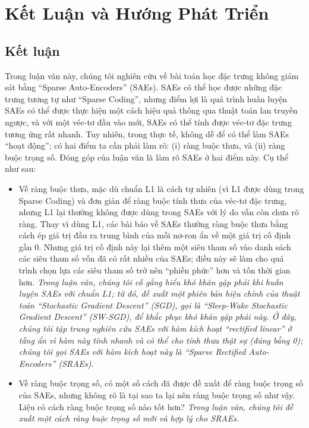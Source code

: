 \def\baselinestretch{1}
\chapter{Kết Luận và Hướng Phát Triển}
\ifpdf
    \graphicspath{{Conclusions/ConclusionsFigs/PNG/}{Conclusions/ConclusionsFigs/PDF/}{Conclusions/ConclusionsFigs/}}
\else
    \graphicspath{{Conclusions/ConclusionsFigs/EPS/}{Conclusions/ConclusionsFigs/}}
\fi

\def\baselinestretch{1.66}

\section{Kết luận}
Trong luận văn này, chúng tôi nghiên cứu về bài toán học đặc trưng không giám sát bằng ``Sparse Auto-Encoders'' (SAEs). SAEs có thể học được những đặc trưng tương tự như ``Sparse Coding'', nhưng điểm lợi là quá trình huấn luyện SAEs có thể được thực hiện một cách hiệu quả thông qua thuật toán lan truyền ngược, và với một véc-tơ đầu vào mới, SAEs có thể tính được véc-tơ đặc trưng tương ứng rất nhanh. Tuy nhiên, trong thực tế, không dễ để có thể làm SAEs ``hoạt động''; có hai điểm ta cần phải làm rõ: (i) ràng buộc thưa, và (ii) ràng buộc trọng số. Đóng góp của luận văn là làm rõ SAEs ở hai điểm này. Cụ thể như sau:
\begin{itemize}
	\item Về ràng buộc thưa, mặc dù chuẩn L1 là cách tự nhiên (vì L1 được dùng trong Sparse Coding) và đơn giản để ràng buộc tính thưa của véc-tơ đặc trưng, nhưng L1 lại thường không được dùng trong SAEs với lý do vẫn còn chưa rõ ràng. Thay vì dùng L1, các bài báo về SAEs thường ràng buộc thưa bằng cách ép giá trị đầu ra trung bình của mỗi nơ-ron ẩn về một giá trị cố định gần $0$. Nhưng giá trị cố định này lại thêm một siêu tham số vào danh sách các siêu tham số vốn đã có rất nhiều của SAEs; điều này sẽ làm cho quá trình chọn lựa các siêu tham số trở nên ``phiền phức'' hơn và tốn thời gian hơn. \emph{Trong luận văn, chúng tôi cố gắng hiểu khó khăn gặp phải khi huấn luyện SAEs với chuẩn L1; từ đó, đề xuất một phiên bản hiệu chỉnh của thuật toán ``Stochastic Gradient Descent'' (SGD), gọi là ``Sleep-Wake Stochastic Gradient Descent'' (SW-SGD), để khắc phục khó khăn gặp phải này. Ở đây, chúng tôi tập trung nghiên cứu SAEs với hàm kích hoạt ``rectified linear'' ở tầng ẩn vì hàm này tính nhanh và có thể cho tính thưa thật sự (đúng bằng 0); chúng tôi gọi SAEs với hàm kích hoạt này là ``Sparse Rectified Auto-Encoders'' (SRAEs).}
	\item Về ràng buộc trọng số, có một số cách đã được đề xuất để ràng buộc trọng số của SAEs, nhưng không rõ là tại sao ta lại nên ràng buộc trọng số như vậy. Liệu có cách ràng buộc trọng số nào tốt hơn? \emph{Trong luận văn, chúng tôi đề xuất một cách ràng buộc trọng số mới và hợp lý cho SRAEs.}
\end{itemize}

